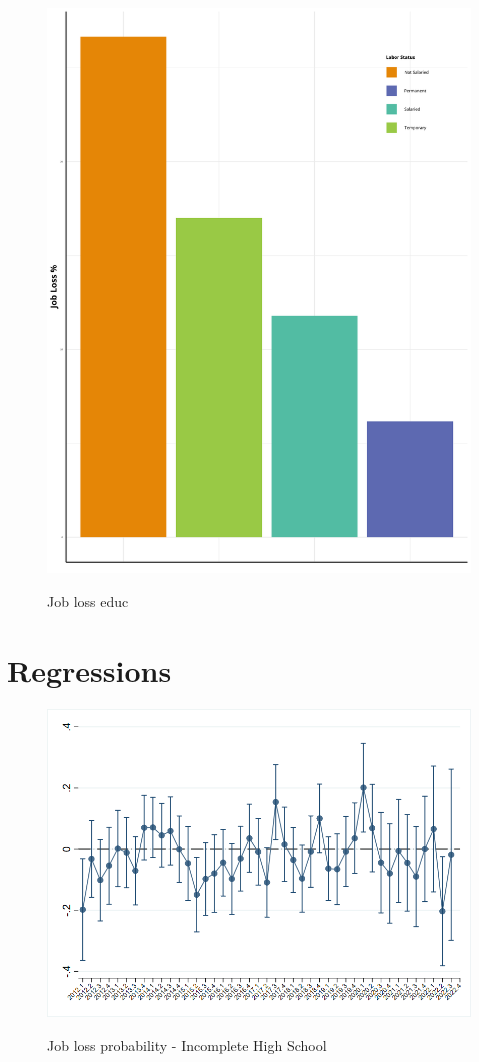 \documentclass[a4paper]{article}
\begin{document}
\begin{figure}[hb]
  \centering
  \caption{Job loss educ}
  \includegraphics[width=0.85\linewidth]{../analysis/output/graph/_graph_job_loss_work_arrangement.png}
  \label{fig:_graph_job_loss_work_arrangement}
\end{figure}

\section{Regressions}

\begin{figure}[hb]
  \centering
  \caption{Job loss probability - Incomplete High School }
  \includegraphics[width=0.85\linewidth]{../analysis/output/graph/_graph_regression_job_loss_determinants_educ2.png}
  \label{fig:_graph_regression_job_loss_determinants_educ2}
\end{figure}
\end{document}
